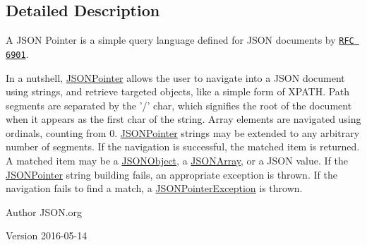 \subsection{Detailed Description}
A J\-S\-O\-N Pointer is a simple query language defined for J\-S\-O\-N documents by \href{https://tools.ietf.org/html/rfc6901}{\tt R\-F\-C 6901}.

In a nutshell, \hyperlink{classorg_1_1json_1_1JSONPointer}{J\-S\-O\-N\-Pointer} allows the user to navigate into a J\-S\-O\-N document using strings, and retrieve targeted objects, like a simple form of X\-P\-A\-T\-H. Path segments are separated by the '/' char, which signifies the root of the document when it appears as the first char of the string. Array elements are navigated using ordinals, counting from 0. \hyperlink{classorg_1_1json_1_1JSONPointer}{J\-S\-O\-N\-Pointer} strings may be extended to any arbitrary number of segments. If the navigation is successful, the matched item is returned. A matched item may be a \hyperlink{classorg_1_1json_1_1JSONObject}{J\-S\-O\-N\-Object}, a \hyperlink{classorg_1_1json_1_1JSONArray}{J\-S\-O\-N\-Array}, or a J\-S\-O\-N value. If the \hyperlink{classorg_1_1json_1_1JSONPointer}{J\-S\-O\-N\-Pointer} string building fails, an appropriate exception is thrown. If the navigation fails to find a match, a \hyperlink{classorg_1_1json_1_1JSONPointerException}{J\-S\-O\-N\-Pointer\-Exception} is thrown.

\begin{DoxyAuthor}{Author}
J\-S\-O\-N.\-org 
\end{DoxyAuthor}
\begin{DoxyVersion}{Version}
2016-\/05-\/14 
\end{DoxyVersion}


